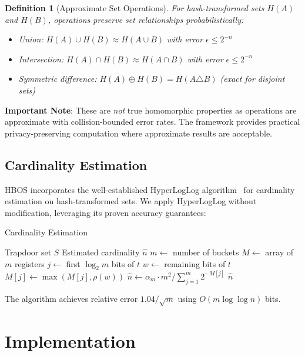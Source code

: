 \documentclass[10pt,conference]{IEEEtran}
\newtheorem{definition}[theorem]{Definition}
\begin{document}
\begin{definition}[Approximate Set Operations]
For hash-transformed sets $H(A)$ and $H(B)$, operations preserve set relationships probabilistically:
\begin{itemize}
\item Union: $H(A) \cup H(B) \approx H(A \cup B)$ with error $\epsilon \leq 2^{-n}$
\item Intersection: $H(A) \cap H(B) \approx H(A \cap B)$ with error $\epsilon \leq 2^{-n}$
\item Symmetric difference: $H(A) \oplus H(B) = H(A \triangle B)$ (exact for disjoint sets)
\end{itemize}
\end{definition}

\textbf{Important Note}: These are \emph{not} true homomorphic properties as operations are approximate with collision-bounded error rates. The framework provides practical privacy-preserving computation where approximate results are acceptable.

\subsection{Cardinality Estimation}

HBOS incorporates the well-established HyperLogLog algorithm~\cite{flajolet2007hyperloglog} for cardinality estimation on hash-transformed sets. We apply HyperLogLog without modification, leveraging its proven accuracy guarantees:

\begin{algorithm}
\caption{Cardinality Estimation}
\label{alg:cardinality}
\begin{algorithmic}[1]
\REQUIRE Trapdoor set $S$
\ENSURE Estimated cardinality $\hat{n}$
\STATE $m \leftarrow$ number of buckets
\STATE $M \leftarrow$ array of $m$ registers
  \STATE $j \leftarrow$ first $\log_2 m$ bits of $t$
  \STATE $w \leftarrow$ remaining bits of $t$
  \STATE $M[j] \leftarrow \max(M[j], \rho(w))$
\ENDFOR
\STATE $\hat{n} \leftarrow \alpha_m \cdot m^2 / \sum_{j=1}^{m} 2^{-M[j]}$
\RETURN $\hat{n}$
\end{algorithmic}
\end{algorithm}

The algorithm achieves relative error $1.04/\sqrt{m}$ using $O(m \log \log n)$ bits.

\section{Implementation}
\label{sec:implementation}
\end{document}
